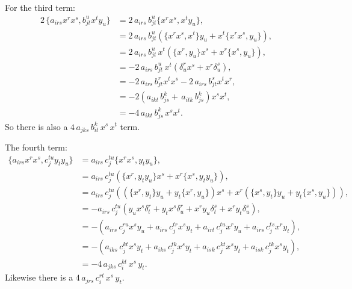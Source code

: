     For the third term:
    \begin{align*}
        2 \, \{ a_{irs} x^r x^s, b_{jt}^{u} x^t y_u \} &= 2 \,a_{irs}\,  b_{jt}^u \{ x^r x^s, x^t y_u \} ,\\
                                                       &= 2 \,a_{irs}\,  b_{jt}^u  \left( \{  x^r x^s, x^t \} y_u +  x^t \{ x^r x^s , y_u \} \right),\\
                                                       &= 2\, a_{irs} \, b_{jt}^u \, x^t \left( \{ x^r  , y_u \} x^s + x^r \{ x^s, y_u \}  \right),\\
                                                       &= -2\, a_{irs} \, b_{jt}^u \, x^t \left( \delta^{r}_u x^s + x^r \delta^s_u \right),\\
                                                       &= -2 \, a_{irs} \, b_{jt}^r x^t x^s - 2 \, a_{irs} \, b_{jt}^s x^t x^r,\\
                                                       &= -2 \left( a_{ikt} \, b_{js}^k  + \, a_{itk} \, b_{js}^k \right) x^s x^t,\\
                                                       &= -4 \, a_{ikt} \, b_{js}^k  \, x^s x^t.
    \end{align*}
    So there is also a \( 4 \,a_{jks}\,  b_{it}^k \, x^s \, x^t\) term.

    The fourth term:
    \begin{align*}
        \{ a_{irs} x^r x^s, c_{j}^{t u} y_t y_u \} & = a_{irs} \,c_j^{tu} \{ x^r x^s, y_t y_u \},\\
                                                   &= a_{irs}\, c_j^{tu} \left( \{x^r , y_t y_u \} x^s + x^r \{ x^s , y_t y_u \} \right) ,\\
                                                   &= a_{irs}\, c_j^{tu} \left( \left( \{x^r , y_t  \} y_u + y_t \{ x^r, y_u \} \right) x^s + x^r \left( \{ x^s , y_t  \} y_u + y_t \{ x^s , y_u \} \right) \right) ,\\ 
                                                   &= -a_{irs} \, c_j^{tu} \left(    y_u x^s \delta^r_t + y_t x^s \delta^r_u  + x^r y_u \delta^s_t  + x^r y_t \delta^s_u  \right) ,\\ 
                                                   &= - \left( a_{irs} \, c_j^{ru} x^s y_u  +  a_{irs} \, c_j^{tr} x^s y_t +  a_{irt} \, c_j^{tu} x^r y_u   +  a_{irs} \, c_j^{ts} x^r y_t   \right) ,\\
                                                    &= - \left( a_{iks} \, c_j^{kt} x^s y_t  +  a_{iks} \, c_j^{tk}  x^s  y_t  +  a_{isk} \, c_j^{kt} x^s y_t  +  a_{isk} \, c_j^{tk} x^s y_t   \right) ,\\
                                                    &= - 4\, a_{jks}\, c_i^{k t} \,x^s\, y_t.
    \end{align*}
    Likewise there is a \( 4\, a_{jrs}\, c_i^{r t} \,x^s\, y_t\).
    
